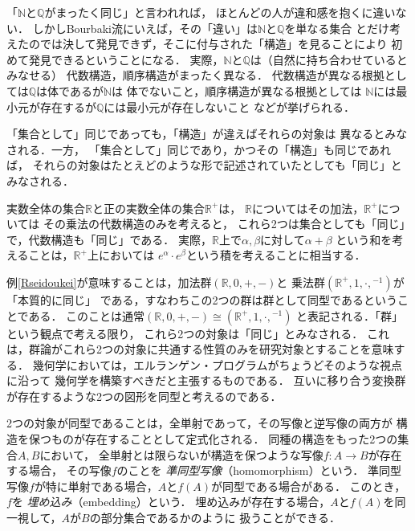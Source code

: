  「$\mathbb{N}$と$\mathbb{Q}$がまったく同じ」と言われれば，
  ほとんどの人が違和感を抱くに違いない．
  しかしBourbaki流にいえば，その「違い」は$\mathbb{N}$と$\mathbb{Q}$を単なる集合
  とだけ考えたのでは決して発見できず，そこに付与された「構造」を見ることにより
  初めて発見できるということになる．
  実際，$\mathbb{N}$と$\mathbb{Q}$は（自然に持ち合わせているとみなせる）
  代数構造，順序構造がまったく異なる．
  代数構造が異なる根拠としては$\mathbb{Q}$は体であるが$\mathbb{N}$は
  体でないこと，順序構造が異なる根拠としては
  $\mathbb{N}$には最小元が存在するが$\mathbb{Q}$には最小元が存在しないこと
  などが挙げられる．

  「集合として」同じであっても，「構造」が違えばそれらの対象は
  異なるとみなされる．一方，
  「集合として」同じであり，かつその「構造」も同じであれば，
  それらの対象はたとえどのような形で記述されていたとしても「同じ」と
  みなされる．

  \begin{ex} \label{Rseidoukei}
    実数全体の集合$\mathbb{R}$と正の実数全体の集合$\mathbb{R}^+$は，
    $\mathbb{R}$についてはその加法，$\mathbb{R}^+$については
    その乗法の代数構造のみを考えると，
    これら2つは集合としても「同じ」で，代数構造も「同じ」である．
    実際，$\mathbb{R}$上で$\alpha , \beta$に対して$\alpha + \beta$
    という和を考えることは，$\mathbb{R}^+$上においては
    $e^{\alpha} \cdot e^{\beta}$という積を考えることに相当する．
  \end{ex}

  例\ref{Rseidoukei}が意味することは，加法群$( \mathbb{R} , 0, +,-)$と
  乗法群$( \mathbb{R}^+, 1, \cdot,{}^{-1}) $が「本質的に同じ」
  である，すなわちこの2つの群は群として同型であるということである．
  このことは通常$(\mathbb{R},0,+, -) \cong (\mathbb{R}^+ ,1,\cdot , {}^{-1})$
  と表記される．「群」という観点で考える限り，
  これら2つの対象は「同じ」とみなされる．
  これは，群論がこれら2つの対象に共通する性質のみを研究対象とすることを意味する．
  幾何学においては，エルランゲン・プログラムがちょうどそのような視点に沿って
  幾何学を構築すべきだと主張するものである．
  互いに移り合う変換群が存在するような2つの図形を同型と考えるのである．

  2つの対象が同型であることは，全単射であって，その写像と逆写像の両方が
  構造を保つものが存在することとして定式化される．
  同種の構造をもった2つの集合$A,B$において，
  全単射とは限らないが構造を保つような写像$f:A \longrightarrow B$が存在する場合，
  その写像$f$のことを
  \emph{準同型写像}（homomorphism）という．
  準同型写像$f$が特に単射である場合，$A$と$f(A)$が同型である場合がある．
  このとき，$f$を
  \emph{埋め込み}（embedding）という．
  埋め込みが存在する場合，$A$と$f(A)$を同一視して，$A$が$B$の部分集合であるかのように
  扱うことができる．

